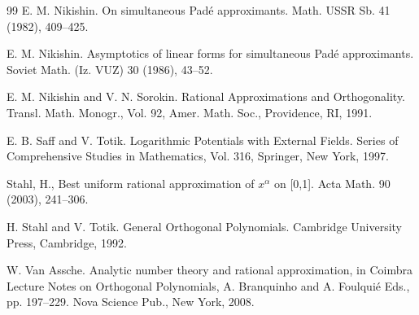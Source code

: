 \documentclass{amsart}
\theoremstyle{definition}
\theoremstyle{remark}
\begin{document}
\begin{thebibliography}{99}
E. M. Nikishin.  On simultaneous Pad\'e approximants.  Math. USSR Sb.   41 (1982), 409--425.

 E. M. Nikishin.  Asymptotics of linear forms for
simultaneous Pad\'e approximants. Soviet Math. (Iz. VUZ)
30 (1986), 43--52.

E. M. Nikishin and V. N. Sorokin.  Rational Approximations and Orthogonality. Transl.  Math. Monogr., Vol. 92, Amer. Math. Soc., Providence, RI, 1991.







  E. B. Saff and V. Totik. Logarithmic Potentials with
External Fields. Series of Comprehensive Studies in Mathematics,
Vol. 316, Springer, New York, 1997.

  Stahl, H., Best uniform rational approximation of $x^{\alpha}$ on [0,1]. Acta Math. 90 (2003), 241--306.

 H. Stahl and V. Totik.  General Orthogonal Polynomials.  Cambridge University Press, Cambridge, 1992.


  W. Van Assche. Analytic number theory and rational approximation, in Coimbra Lecture Notes on Orthogonal Polynomials, A. Branquinho and A. Foulqui\'{e} Eds., pp. 197--229. Nova Science Pub., New York, 2008.


\end{thebibliography}
\end{document}
